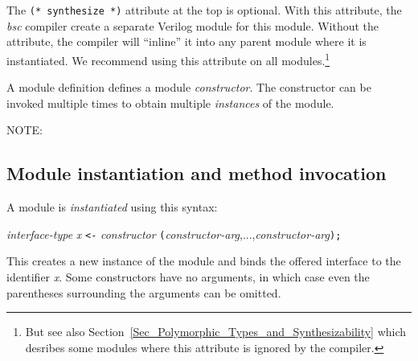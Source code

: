 
The \verb|(* synthesize *)| attribute at the top is optional.  With
this attribute, the \emph{bsc} compiler create a separate Verilog
module for this {\BSV} module.  Without the attribute, the compiler will
``inline'' it into any parent module where it is instantiated.  We
recommend using this attribute on all modules.\footnote{But see also
Section~\ref{Sec_Polymorphic_Types_and_Synthesizability} which
desribes some modules where this attribute is ignored by the
compiler.}


A module definition defines a module \emph{constructor}. The
constructor can be invoked multiple times to obtain multiple
\emph{instances} of the module.

\vspace{2ex}

NOTE: 


\subsection{Module instantiation and method invocation}

\label{Sec_Module_instantiation_and_method_invocation}


A module is \emph{instantiated} using this syntax:

\hm \emph{interface-type} \emph{x} {\tt <-} \emph{constructor} {\tt (}\emph{constructor-arg},...,\emph{constructor-arg}{\tt );}

This creates a new instance of the module and binds the offered
interface to the identifier \emph{x}.  Some constructors have no
arguments, in which case even the parentheses surrounding the
arguments can be omitted.


